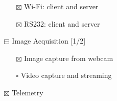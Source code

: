 \begin{itemize}
\begin{itemize}
\begin{itemize}
\item[{$\boxtimes$}] Wi-Fi: client and server
\item[{$\boxtimes$}] RS232: client and server
\end{itemize}
\item[{$\boxminus$}] Image Acquisition [1/2]
\begin{itemize}
\item[{$\boxtimes$}] Image capture from webcam
\item[{$\square$}] Video capture and streaming
\end{itemize}
\item[{$\boxtimes$}] Telemetry
\end{itemize}
\end{itemize}
%
%
